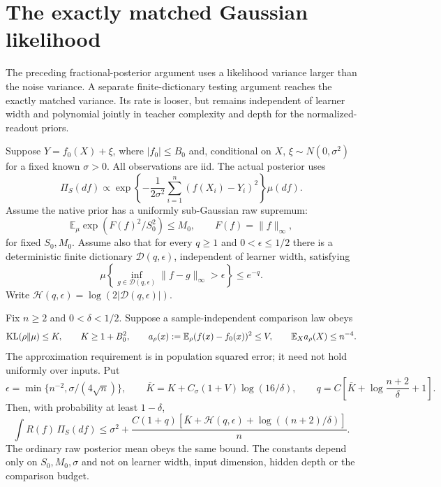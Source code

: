 \section{The exactly matched Gaussian likelihood}
\label{sec:matched-gaussian-likelihood}
The preceding fractional-posterior argument uses a likelihood variance larger than the noise variance. A separate finite-dictionary testing argument reaches the exactly matched variance. Its rate is looser, but remains independent of learner width and polynomial jointly in teacher complexity and depth for the normalized-readout priors.

Suppose $Y=f_0(X)+\xi$, where $|f_0|\le B_0$ and, conditional on $X$, $\xi\sim N(0,\sigma^2)$ for a fixed known $\sigma>0$. All observations are iid. The actual posterior uses
\[
 \Pi_S(df)\propto\exp\left\{-\frac1{2\sigma^2}
                    \sum_{i=1}^n(f(X_i)-Y_i)^2\right\}\mu(df).
\]
Assume the native prior has a uniformly sub-Gaussian raw supremum:
\begin{equation}
 \mathbb E_\mu\exp(F(f)^2/S_0^2)\le M_0,
 \qquad F(f)=\|f\|_\infty,
 \label{eq:matched-native-envelope}
\end{equation}
for fixed $S_0,M_0$. Assume also that for every $q\ge1$ and $0<\epsilon\le1/2$ there is a deterministic finite dictionary $\mathcal D(q,\epsilon)$, independent of learner width, satisfying
\[
 \mu\left\{\inf_{g\in\mathcal D(q,\epsilon)}
                      \|f-g\|_\infty>\epsilon\right\}\le e^{-q}.
\]
Write $\mathcal H(q,\epsilon)=\log(2|\mathcal D(q,\epsilon)|)$.

\begin{theorem}
\label{thm:matched-gaussian-likelihood}
Fix $n\ge2$ and $0<\delta<1/2$. Suppose a sample-independent comparison law obeys
\[
 \operatorname{KL}(\rho\|\mu)\le K,\qquad K\ge1+B_0^2,
 \qquad a_\rho(x):=\mathbb E_\rho(f(x)-f_0(x))^2\le V,
 \qquad \mathbb E_Xa_\rho(X)\le n^{-4}.
\]
The approximation requirement is in population squared error; it need not hold uniformly over inputs. Put
\[
 \epsilon=\min\{n^{-2},\sigma/(4\sqrt n)\},\qquad
 \overline K=K+C_\sigma(1+V)\log(16/\delta),\qquad
 q=C\left[\overline K+\log\frac{n+2}{\delta}+1\right].
\]
Then, with probability at least $1-\delta$,
\begin{equation}
 \int R(f)\,\Pi_S(df)
 \le\sigma^2+
 \frac{C(1+q)\left[\overline K+\mathcal H(q,\epsilon)
                                 +\log((n+2)/\delta)\right]}n.
 \label{eq:matched-gaussian-hp}
\end{equation}
The ordinary raw posterior mean obeys the same bound. The constants depend only on $S_0,M_0,\sigma$ and not on learner width, input dimension, hidden depth or the comparison budget.
\end{theorem}

